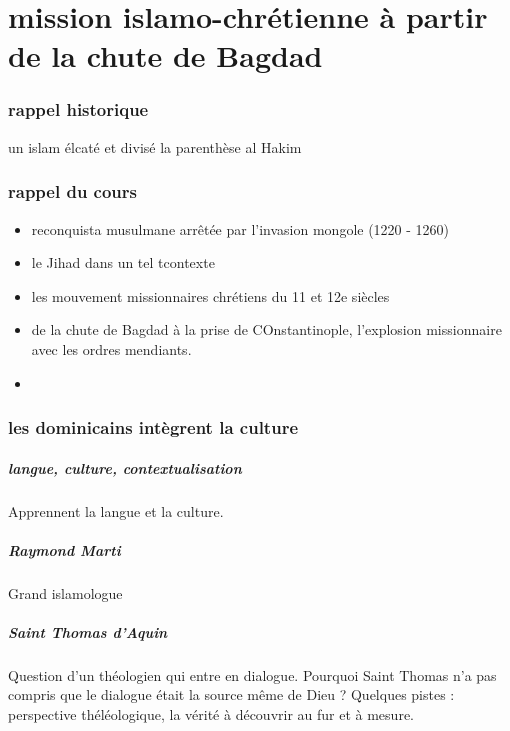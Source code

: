 \chapter{mission islamo-chrétienne à partir de la chute de Bagdad}


\subsection{rappel historique}

un islam élcaté et divisé
la parenthèse al Hakim

\subsection{rappel du cours}
\begin{itemize}
  
\item reconquista musulmane arrêtée par l'invasion mongole (1220 - 1260)
\item le Jihad dans un tel tcontexte
\item les mouvement missionnaires chrétiens du 11 et 12e siècles
\item de la chute de Bagdad à la prise de COnstantinople, l'explosion missionnaire avec les ordres mendiants.
  \item 
\end{itemize}

\subsection{les dominicains intègrent la culture} 

\paragraph{langue, culture, contextualisation}Apprennent la langue et la culture. 

\paragraph{Raymond Marti} Grand islamologue

\paragraph{Saint Thomas d'Aquin}
Question d'un théologien qui entre en dialogue. Pourquoi Saint Thomas n'a pas compris que le dialogue était la source même de Dieu ?  
Quelques pistes : perspective théléologique, la vérité à découvrir au fur et à mesure.

